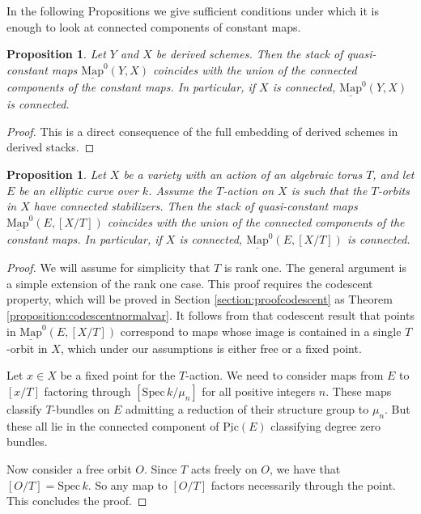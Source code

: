 \documentclass[11pt,letterpaper]{amsart}
\newtheorem{proposition}[dummy]{Proposition}
\newtheorem{remark}[dummy]{Remark}
\newcommand{\Mapo}[2]{\underline{\mathrm{Map}}^{0}\left (#1,#2\right )}
\newcommand{\Spec}{\mathrm{S}\mathrm{pec}\,}
\newcommand{\Pic}{\underline{\mathrm{Pic}}}
\begin{document}
In the following Propositions we give sufficient conditions under which it is enough to look at connected components of constant maps.
\begin{proposition}\label{example:MapoVar}
Let $Y$ and $X$ be  derived schemes. Then the stack of quasi-constant maps $\Mapo{Y}{X}$ coincides with the union of the connected components of the constant maps. In particular, if $X$ is connected, $\Mapo{Y}{X}$ is connected. 
\end{proposition}
\begin{proof}
This is a direct consequence of the full embedding of derived schemes in derived stacks.
\end{proof}
\begin{proposition}
\label{connectedstab}
Let $X$ be a variety with an action of  an algebraic torus $T$, and let $E$ be an elliptic curve over $k$. Assume the $T$-action on $X$ is such that the $T$-orbits in $X$ have connected stabilizers. Then the stack of quasi-constant maps $\Mapo{E}{[X/T]}$ coincides with the union of the connected components of the constant maps. In particular, if $X$ is connected, $\Mapo{E}{[X/T]}$ is connected. 
\end{proposition}
\begin{proof}
We will assume for simplicity that $T$ is rank one. The general argument is a simple extension of the rank one case. This proof requires the codescent property, which will be proved in Section \ref{section:proofcodescent} as Theorem \ref{proposition:codescentnormalvar}. It follows from that  codescent result that points in $\Mapo{E}{[X/T]}$ correspond to maps whose image is contained in a single $T$-orbit in $X$, which under our assumptions is either free or a fixed point.  

Let $x \in X$ be a fixed point for the $T$-action. 
We need to consider maps from $E$ to $[x/T]$ factoring through $[\Spec k/\mu_n]$ for all positive integers $n$. 
These maps classify $T$-bundles on $E$ admitting a reduction of their structure group to $\mu_n$. But these all lie in the connected component of $\Pic(E)$ classifying degree zero bundles. 

Now consider a free orbit $O$. 
Since $T$ acts freely on $O$, we have that $[O/T]=\Spec k$. So any map to $[O/T]$ factors necessarily through the point.  This concludes the proof.
\end{proof}
\end{document}
